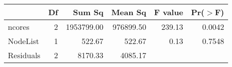 \begin{table}[ht]
\centering
\begin{tabular}{lrrrrr}
  \hline
 & Df & Sum Sq & Mean Sq & F value & Pr($>$F) \\ 
  \hline
ncores & 2 & 1953799.00 & 976899.50 & 239.13 & 0.0042 \\ 
  NodeList & 1 & 522.67 & 522.67 & 0.13 & 0.7548 \\ 
  Residuals & 2 & 8170.33 & 4085.17 &  &  \\ 
   \hline
\end{tabular}
\end{table}
